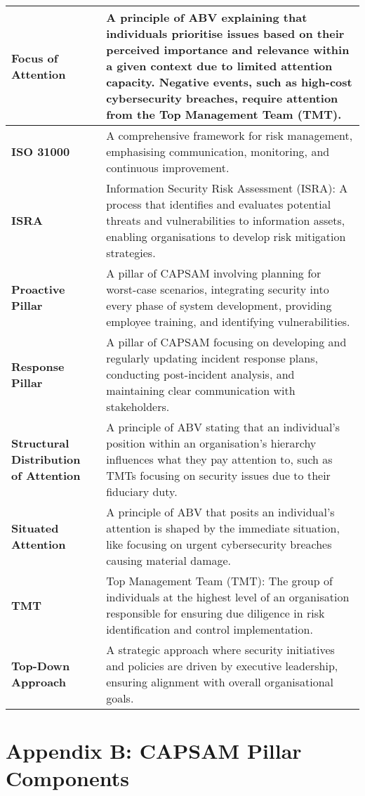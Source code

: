 \begin{longtable}{|>{\raggedright}m{4cm}|m{10cm}|}
    \textbf{Focus of Attention} & A principle of ABV explaining that individuals prioritise issues based on their perceived importance and relevance within a given context due to limited attention capacity. Negative events, such as high-cost cybersecurity breaches, require attention from the Top Management Team (TMT). \\ \hline
    \textbf{ISO 31000} & A comprehensive framework for risk management, emphasising communication, monitoring, and continuous improvement. \\ \hline
    \textbf{ISRA} & Information Security Risk Assessment (ISRA): A process that identifies and evaluates potential threats and vulnerabilities to information assets, enabling organisations to develop risk mitigation strategies. \\ \hline
    \textbf{Proactive Pillar} & A pillar of CAPSAM involving planning for worst-case scenarios, integrating security into every phase of system development, providing employee training, and identifying vulnerabilities. \\ \hline
    \textbf{Response Pillar} & A pillar of CAPSAM focusing on developing and regularly updating incident response plans, conducting post-incident analysis, and maintaining clear communication with stakeholders. \\ \hline
    \textbf{Structural Distribution of Attention} & A principle of ABV stating that an individual's position within an organisation's hierarchy influences what they pay attention to, such as TMTs focusing on security issues due to their fiduciary duty. \\ \hline
    \textbf{Situated Attention} & A principle of ABV that posits an individual's attention is shaped by the immediate situation, like focusing on urgent cybersecurity breaches causing material damage. \\ \hline
    \textbf{TMT} & Top Management Team (TMT): The group of individuals at the highest level of an organisation responsible for ensuring due diligence in risk identification and control implementation. \\ \hline
    \textbf{Top-Down Approach} & A strategic approach where security initiatives and policies are driven by executive leadership, ensuring alignment with overall organisational goals. \\ \hline
\end{longtable}

\newpage

\section*{Appendix B: CAPSAM Pillar Components}

